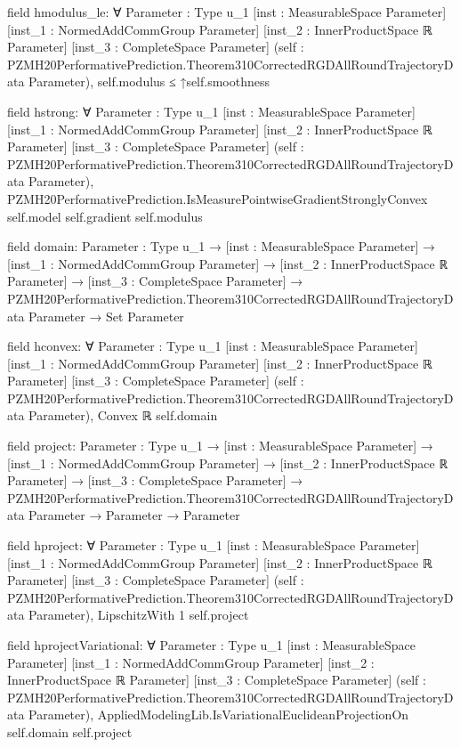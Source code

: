 \documentclass[10pt]{article}
\begin{document}
\begin{ReviewVerbatim}
field hmodulus_le:
∀ {Parameter : Type u_1} [inst : MeasurableSpace Parameter] [inst_1 : NormedAddCommGroup Parameter]
  [inst_2 : InnerProductSpace ℝ Parameter] [inst_3 : CompleteSpace Parameter]
  (self : PZMH20PerformativePrediction.Theorem310CorrectedRGDAllRoundTrajectoryData Parameter),
  self.modulus ≤ ↑self.smoothness

field hstrong:
∀ {Parameter : Type u_1} [inst : MeasurableSpace Parameter] [inst_1 : NormedAddCommGroup Parameter]
  [inst_2 : InnerProductSpace ℝ Parameter] [inst_3 : CompleteSpace Parameter]
  (self : PZMH20PerformativePrediction.Theorem310CorrectedRGDAllRoundTrajectoryData Parameter),
  PZMH20PerformativePrediction.IsMeasurePointwiseGradientStronglyConvex self.model self.gradient self.modulus

field domain:
{Parameter : Type u_1} →
  [inst : MeasurableSpace Parameter] →
    [inst_1 : NormedAddCommGroup Parameter] →
      [inst_2 : InnerProductSpace ℝ Parameter] →
        [inst_3 : CompleteSpace Parameter] →
          PZMH20PerformativePrediction.Theorem310CorrectedRGDAllRoundTrajectoryData Parameter → Set Parameter

field hconvex:
∀ {Parameter : Type u_1} [inst : MeasurableSpace Parameter] [inst_1 : NormedAddCommGroup Parameter]
  [inst_2 : InnerProductSpace ℝ Parameter] [inst_3 : CompleteSpace Parameter]
  (self : PZMH20PerformativePrediction.Theorem310CorrectedRGDAllRoundTrajectoryData Parameter), Convex ℝ self.domain

field project:
{Parameter : Type u_1} →
  [inst : MeasurableSpace Parameter] →
    [inst_1 : NormedAddCommGroup Parameter] →
      [inst_2 : InnerProductSpace ℝ Parameter] →
        [inst_3 : CompleteSpace Parameter] →
          PZMH20PerformativePrediction.Theorem310CorrectedRGDAllRoundTrajectoryData Parameter → Parameter → Parameter

field hproject:
∀ {Parameter : Type u_1} [inst : MeasurableSpace Parameter] [inst_1 : NormedAddCommGroup Parameter]
  [inst_2 : InnerProductSpace ℝ Parameter] [inst_3 : CompleteSpace Parameter]
  (self : PZMH20PerformativePrediction.Theorem310CorrectedRGDAllRoundTrajectoryData Parameter),
  LipschitzWith 1 self.project

field hprojectVariational:
∀ {Parameter : Type u_1} [inst : MeasurableSpace Parameter] [inst_1 : NormedAddCommGroup Parameter]
  [inst_2 : InnerProductSpace ℝ Parameter] [inst_3 : CompleteSpace Parameter]
  (self : PZMH20PerformativePrediction.Theorem310CorrectedRGDAllRoundTrajectoryData Parameter),
  AppliedModelingLib.IsVariationalEuclideanProjectionOn self.domain self.project


\end{ReviewVerbatim}
\end{document}
